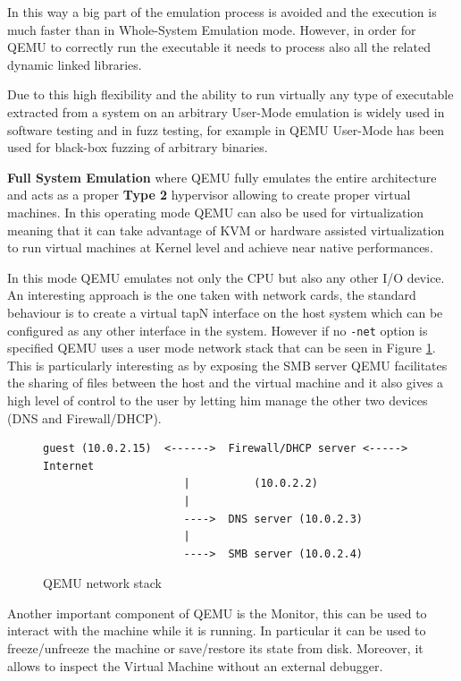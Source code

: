 In this way a big part of the emulation process is avoided and the execution is much faster than in Whole-System Emulation mode. However, in order for QEMU to correctly run the executable it needs to process also all the related dynamic linked libraries. 

Due to this high flexibility and the ability to run virtually any type of executable extracted from a system on an arbitrary User-Mode emulation is widely used in software testing and in fuzz testing, for example in \cite{QASan-SecDev20} QEMU User-Mode has been used for black-box fuzzing of arbitrary binaries.

\textbf{Full System Emulation} where QEMU fully emulates the entire architecture and acts as a proper \textbf{Type 2} hypervisor allowing to create proper virtual machines. In this operating mode QEMU can also be used for virtualization meaning that it can take advantage of KVM or hardware assisted virtualization to run virtual machines at Kernel level and achieve near native performances. 

In this mode QEMU emulates not only the CPU but also any other I/O device. An interesting approach is the one taken with network cards, the standard behaviour is to create a virtual tapN interface on the host system which can be configured as any other interface in the system. However if no \lstinline{-net} option is specified QEMU uses a user mode network stack that can be seen in Figure \ref{fig:qemunet}. This is particularly interesting as by exposing the SMB server 
QEMU facilitates the sharing of files between the host and the virtual machine and it also gives a high level of control to the user by letting him manage the other two devices (DNS and Firewall/DHCP).

\begin{figure}[htp]
\centering
\begin{lstlisting}
guest (10.0.2.15)  <------>  Firewall/DHCP server <-----> Internet
                      |          (10.0.2.2)
                      |
                      ---->  DNS server (10.0.2.3)
                      |
                      ---->  SMB server (10.0.2.4)
\end{lstlisting}
\caption{QEMU network stack}
\label{fig:qemunet}
\end{figure}

Another important component of QEMU is the Monitor, this can be used to interact with the machine while it is running. In particular it can be used to freeze/unfreeze the machine or save/restore its state from disk. Moreover, it allows to inspect the Virtual Machine without an external debugger.

